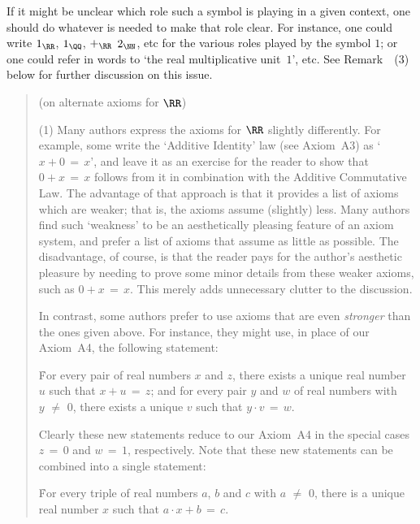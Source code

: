         If it might be unclear which role such a symbol is playing in a given context, one should do whatever is needed to make that role clear.
    For instance, one could write $1_{{\RR}}$, $1_{{\QQ}}$, $+_{{\RR}}$ $2_{{\NN}}$, etc for the various roles played by the symbol $1$;
    or one could refer in words to `the real multiplicative unit~$1$', etc. See Remark~~(3) below for further discussion on this issue.


\V
\V

\begin{quotation}
{\footnotesize \underline{\Notes} (on alternate axioms for ${\RR}$)

\V

\hspace*{\parindent}(1) Many authors express the axioms for ${\RR}$ slightly differently.
    For example, some write the `Additive Identity' law (see Axiom~A3) as `$x+0 \,=\, x$',
    and leave it as an exercise for the reader to show that $0+x \,=\, x$ follows from it in combination with the Additive Commutative Law.
    The advantage of that approach is that it provides a list of axioms which are weaker; that is, the axioms assume (slightly) less.
    Many authors find such `weakness' to be an aesthetically pleasing feature of an axiom system,
    and prefer a list of axioms that assume as little as possible. The disadvantage, of course,
    is that the reader pays for the author's aesthetic pleasure by needing to prove some minor details from these weaker axioms, such as $0+x \,=\, x$.
    This merely adds unnecessary clutter to the discussion.

        In contrast, some authors prefer to use axioms that are even {\em stronger} than the ones given above.
    For instance, they might use, in place of our Axiom~A4, the following statement:

\VA

       \h For every pair of real numbers $x$ and $z$, there exists a unique real number $u$ such that $x+u \,=\, z$;
    and for every pair $y$ and $w$ of real numbers with $y \,\,{\neq}\,\, 0$, there exists a unique $v$ such that $y{\cdot}v \,=\, w$.

\VA

\noindent Clearly these new statements reduce to our Axiom~A4 in the special cases $z \,=\, 0$ and $w \,=\, 1$, respectively.
    Note that these new statements can be combined into a single statement:

        \h For every triple of real numbers $a$, $b$ and $c$ with $a\,\,{\neq}\,\,0$, there is a unique real number $x$ such that $a{\cdot}x + b\,=\,c$.

}
\end{quotation}
